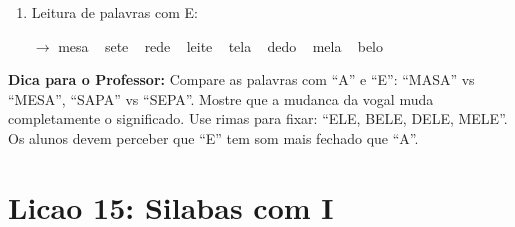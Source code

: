 \begin{exercicio}
\begin{enumerate}[resume]
  \item Leitura de palavras com E:
  \begin{center}
  $\rightarrow$ mesa  ~  sete  ~  rede  ~  leite  ~  tela  ~  dedo  ~  mela  ~  belo
  \end{center}
\end{enumerate}
\end{exercicio}

\begin{dica}
\textbf{Dica para o Professor:} Compare as palavras com ``A'' e ``E'': ``MASA'' vs ``MESA'', ``SAPA'' vs ``SEPA''. Mostre que a mudanca da vogal muda completamente o significado. Use rimas para fixar: ``ELE, BELE, DELE, MELE''. Os alunos devem perceber que ``E'' tem som mais fechado que ``A''.
\end{dica}

\section{Licao 15: Silabas com I}

\rotinasimples
{}



